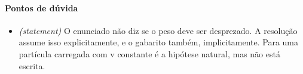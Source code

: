 \documentclass{article}%
\begin{document}
\paragraph{Pontos de dúvida}%
\begin{itemize}%
\item%
\textit{(statement)} O enunciado não diz se o peso deve ser desprezado. A resolução assume isso explicitamente, e o gabarito também, implicitamente. Para uma partícula carregada com v constante é a hipótese natural, mas não está escrita.%
\end{itemize}%
\end{document}
